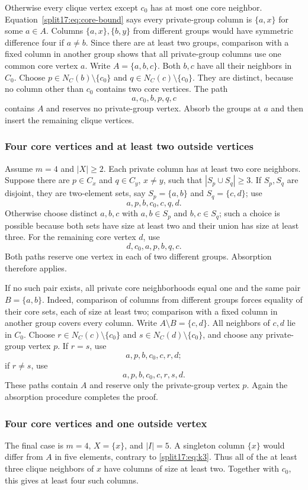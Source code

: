 \documentclass[11pt,a4paper]{article}
\theoremstyle{definition}\newtheorem{definition}[theorem]{Definition}
\theoremstyle{remark}\newtheorem{remark}[theorem]{Remark}
\begin{document}
Otherwise every clique vertex except $c_0$ has at most one core neighbor.
Equation~\eqref{split17:eq:core-bound} says every private-group column is
$\{a,x\}$ for some $a\in A$. Columns $\{a,x\},\{b,y\}$ from different
groups would have symmetric difference four if $a\ne b$. Since there
are at least two groups, comparison with a fixed column in another group
shows that all private-group columns use one common core vertex $a$.
Write $A=\{a,b,c\}$. Both $b,c$ have all their neighbors in $C_0$.
Choose $p\in N_C(b)\setminus\{c_0\}$ and
$q\in N_C(c)\setminus\{c_0\}$. They are distinct, because no column
other than $c_0$ contains two core vertices. The path
\[
 a,c_0,b,p,q,c
\]
contains $A$ and reserves no private-group vertex. Absorb the groups at
$a$ and then insert the remaining clique vertices.

\subsubsection{Four core vertices and at least two outside vertices}
Assume $m=4$ and $|X|\ge2$. Each private column has at least two core
neighbors. Suppose there are $p\in C_x$ and $q\in C_y$, $x\ne y$, such
that $|S_p\cup S_q|\ge3$.
If $S_p,S_q$ are disjoint, they are two-element sets, say
$S_p=\{a,b\}$ and $S_q=\{c,d\}$; use
\[
 a,p,b,c_0,c,q,d.
\]
Otherwise choose distinct $a,b,c$ with $a,b\in S_p$ and $b,c\in S_q$;
such a choice is possible because both sets have size at least two and
their union has size at least three. For the remaining core vertex $d$,
use
\[
 d,c_0,a,p,b,q,c.
\]
Both paths reserve one vertex in each of two different groups. Absorption
therefore applies.

If no such pair exists, all private core neighborhoods equal one
and the same pair $B=\{a,b\}$. Indeed, comparison of columns from different
groups forces equality of their core sets, each of size at least two;
comparison with a fixed column in another group covers every column.
Write $A\setminus B=\{c,d\}$. All neighbors of $c,d$ lie in $C_0$.
Choose $r\in N_C(c)\setminus\{c_0\}$ and
$s\in N_C(d)\setminus\{c_0\}$, and choose any private-group vertex $p$.
If $r=s$, use
\[
 a,p,b,c_0,c,r,d;
\]
if $r\ne s$, use
\[
 a,p,b,c_0,c,r,s,d.
\]
These paths contain $A$ and reserve only the private-group vertex $p$.
Again the absorption procedure completes the proof.

\subsubsection{Four core vertices and one outside vertex}
The final case is $m=4$, $X=\{x\}$, and $|I|=5$.
A singleton column $\{x\}$ would differ from $A$ in five elements,
contrary to \eqref{split17:eq:k3}. Thus all of the at least three clique neighbors
of $x$ have columns of size at least two. Together with $c_0$, this gives
at least four such columns.
\end{document}
